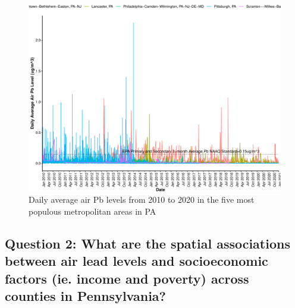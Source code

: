 \documentclass[
  12pt,
]{article}
\begin{document}
\begin{figure}

\includegraphics{Alcorn_Bao_Hermanson_ENV872_Project_files/figure-latex/linear-interp-visual-1} \hfill{}

\caption{Daily average air Pb levels from 2010 to 2020 in the five most populous metropolitan areas in PA}\label{fig:linear-interp-visual}
\end{figure}

\hypertarget{question-2-what-are-the-spatial-associations-between-air-lead-levels-and-socioeconomic-factors-ie.-income-and-poverty-across-counties-in-pennsylvania-1}{%
\subsection{Question 2: What are the spatial associations between air
lead levels and socioeconomic factors (ie. income and poverty) across
counties in
Pennsylvania?}\label{question-2-what-are-the-spatial-associations-between-air-lead-levels-and-socioeconomic-factors-ie.-income-and-poverty-across-counties-in-pennsylvania-1}}
\end{document}
